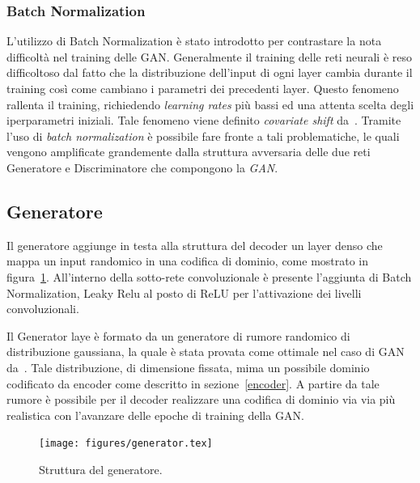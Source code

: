 \subsubsection{Batch Normalization}
L'utilizzo di Batch Normalization è stato introdotto per contrastare la nota difficoltà nel training delle GAN. Generalmente il training delle reti neurali è reso difficoltoso dal fatto che la distribuzione dell'input di ogni layer cambia durante il training così come cambiano i parametri dei precedenti layer. Questo fenomeno rallenta il training, richiedendo \textit{learning rates} più bassi ed una attenta scelta degli iperparametri iniziali. Tale fenomeno viene definito \textit{covariate shift} da~\cite{1502.03167}. Tramite l'uso di \textit{batch normalization} è possibile fare fronte a tali problematiche, le quali vengono amplificate grandemente dalla struttura avversaria delle due reti Generatore e Discriminatore che compongono la \textit{GAN}. 

\subsection{Generatore}
\label{generator}
Il generatore aggiunge in testa alla struttura del decoder un layer denso che mappa un input randomico in una codifica di dominio, come mostrato in figura~\ref{fig:generator}. All'interno della sotto-rete convoluzionale è presente l'aggiunta di Batch Normalization, Leaky Relu al posto di ReLU per l'attivazione dei livelli convoluzionali.

Il Generator laye è formato da un generatore di rumore randomico di distribuzione gaussiana, la quale è stata provata come ottimale nel caso di GAN da~\cite{gaussian}. Tale distribuzione, di dimensione fissata, mima un possibile dominio codificato da encoder come descritto in sezione~\ref{encoder}. A partire da tale rumore è possibile per il decoder realizzare una codifica di dominio via via più realistica con l'avanzare delle epoche di training della GAN.

\begin{figure}[htbp]
    \centering
	\texttt{[image: figures/generator.tex]}
	\caption{Struttura del generatore.
\label{fig:generator}}
\end{figure}

